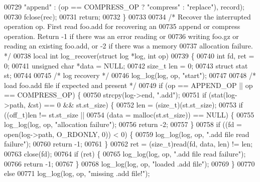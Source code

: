 \begin{DoxyCode}
{00729             \textcolor{stringliteral}{"append"} : (op == COMPRESS\_OP ? \textcolor{stringliteral}{"compress"} : \textcolor{stringliteral}{"replace"}), record);
00730     fclose(rec);
00731     \textcolor{keywordflow}{return};
00732 \}
00733 
00734 \textcolor{comment}{/* Recover the interrupted operation op.  First read foo.add for recovering an}
00735 \textcolor{comment}{   append or compress operation.  Return -1 if there was an error reading or}
00736 \textcolor{comment}{   writing foo.gz or reading an existing foo.add, or -2 if there was a memory}
00737 \textcolor{comment}{   allocation failure. */}
00738 local \textcolor{keywordtype}{int} log\_recover(\textcolor{keyword}{struct} log *log, \textcolor{keywordtype}{int} op)
00739 \{
00740     \textcolor{keywordtype}{int} fd, ret = 0;
00741     \textcolor{keywordtype}{unsigned} \textcolor{keywordtype}{char} *data = NULL;
00742     \textcolor{keywordtype}{size\_t} len = 0;
00743     \textcolor{keyword}{struct }stat st;
00744 
00745     \textcolor{comment}{/* log recovery */}
00746     log\_log(log, op, \textcolor{stringliteral}{"start"});
00747 
00748     \textcolor{comment}{/* load foo.add file if expected and present */}
00749     \textcolor{keywordflow}{if} (op == APPEND\_OP || op == COMPRESS\_OP) \{
00750         strcpy(log->end, \textcolor{stringliteral}{".add"});
00751         \textcolor{keywordflow}{if} (stat(log->path, &st) == 0 && st.st\_size) \{
00752             len = (size\_t)(st.st\_size);
00753             \textcolor{keywordflow}{if} ((off\_t)len != st.st\_size ||
00754                     (data = malloc(st.st\_size)) == NULL) \{
00755                 log\_log(log, op, \textcolor{stringliteral}{"allocation failure"});
00756                 \textcolor{keywordflow}{return} -2;
00757             \}
00758             \textcolor{keywordflow}{if} ((fd = open(log->path, O\_RDONLY, 0)) < 0) \{
00759                 log\_log(log, op, \textcolor{stringliteral}{".add file read failure"});
00760                 \textcolor{keywordflow}{return} -1;
00761             \}
00762             ret = (size\_t)read(fd, data, len) != len;
00763             close(fd);
00764             \textcolor{keywordflow}{if} (ret) \{
00765                 log\_log(log, op, \textcolor{stringliteral}{".add file read failure"});
00766                 \textcolor{keywordflow}{return} -1;
00767             \}
00768             log\_log(log, op, \textcolor{stringliteral}{"loaded .add file"});
00769         \}
00770         \textcolor{keywordflow}{else}
00771             log\_log(log, op, \textcolor{stringliteral}{"missing .add file!"});
}
\end{DoxyCode}
